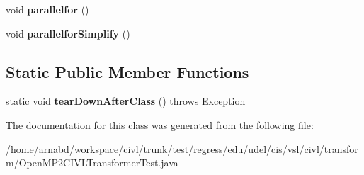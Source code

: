 \begin{DoxyCompactItemize}
\item 
\hypertarget{classedu_1_1udel_1_1cis_1_1vsl_1_1civl_1_1transform_1_1OpenMP2CIVLTransformerTest_a64c24d35fe8f0e898ef56da109e42a25}{}void {\bfseries parallelfor} ()\label{classedu_1_1udel_1_1cis_1_1vsl_1_1civl_1_1transform_1_1OpenMP2CIVLTransformerTest_a64c24d35fe8f0e898ef56da109e42a25}

\item 
\hypertarget{classedu_1_1udel_1_1cis_1_1vsl_1_1civl_1_1transform_1_1OpenMP2CIVLTransformerTest_a12bd316b2ff5c9262a729cca46572572}{}void {\bfseries parallelfor\+Simplify} ()\label{classedu_1_1udel_1_1cis_1_1vsl_1_1civl_1_1transform_1_1OpenMP2CIVLTransformerTest_a12bd316b2ff5c9262a729cca46572572}

\end{DoxyCompactItemize}
\subsection*{Static Public Member Functions}
\begin{DoxyCompactItemize}
\item 
\hypertarget{classedu_1_1udel_1_1cis_1_1vsl_1_1civl_1_1transform_1_1OpenMP2CIVLTransformerTest_a3c1610bd662933f3efacecfe74117bad}{}static void {\bfseries tear\+Down\+After\+Class} ()  throws Exception \label{classedu_1_1udel_1_1cis_1_1vsl_1_1civl_1_1transform_1_1OpenMP2CIVLTransformerTest_a3c1610bd662933f3efacecfe74117bad}

\end{DoxyCompactItemize}


The documentation for this class was generated from the following file\+:\begin{DoxyCompactItemize}
\item 
/home/arnabd/workspace/civl/trunk/test/regress/edu/udel/cis/vsl/civl/transform/Open\+M\+P2\+C\+I\+V\+L\+Transformer\+Test.\+java\end{DoxyCompactItemize}
